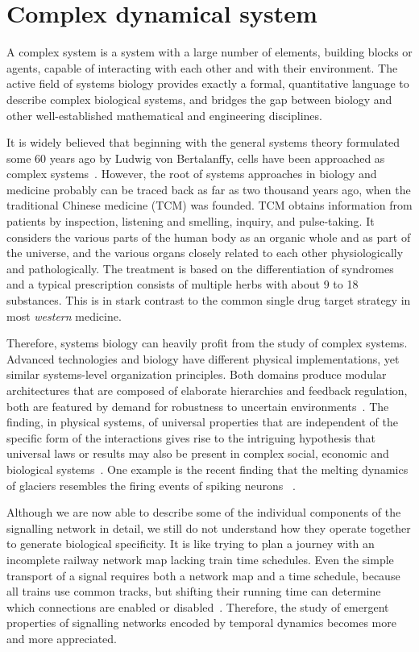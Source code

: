 \section{Complex dynamical system}
A complex system is a system with a large number of
elements, building blocks or agents, capable of interacting
with each other and with their environment.
The
active field of systems biology provides exactly a formal,
quantitative language to describe complex biological 
systems, and
bridges the gap between biology and other well-established
mathematical and engineering disciplines. 

It is widely believed that beginning with the general 
systems theory formulated some 
60 years ago by Ludwig von Bertalanffy, cells have been
approached as complex systems~\citep{Lazebnik2002a}. 
However, the root of systems approaches in biology and
medicine probably can be traced back as far as two 
thousand years
ago, when the traditional Chinese medicine (TCM) was 
founded. TCM obtains information from patients by 
inspection, 
listening and smelling, inquiry, and pulse-taking. 
It considers the various parts of the 
human body as an organic whole and as part of the 
universe, and the various organs closely 
related to each other physiologically and pathologically. 
The treatment is based on the 
differentiation of syndromes and a typical prescription
consists of multiple herbs with about 9 to 18 substances.
This is in stark contrast to the common single drug
target strategy in most \emph{western} medicine.

Therefore, systems biology can heavily profit from the
study of complex systems.
Advanced technologies and biology have different physical
implementations, yet similar systems-level organization
principles. Both domains produce modular architectures that are composed of elaborate hierarchies and feedback regulation, both are featured by demand for
robustness to uncertain environments~\citep{Csete2002}.
The
finding, in physical systems, of universal properties that
are independent of the specific form of the interactions
gives rise to the intriguing hypothesis that universal laws
or results may also be present in complex social, economic
and biological systems~\citep{Amaral2004}. One example is 
the recent finding that the melting dynamics of glaciers
resembles the firing events of spiking neurons~%
\citep{Chapuis2012}.

Although we are now able to describe some of the individual 
components of the 
signalling network in detail, we still do not understand how they operate together to generate biological specificity. It is like trying to plan a journey with an incomplete railway network map lacking train time schedules. Even the simple transport of a signal requires both a network map and a time schedule,
because all trains use common tracks, but shifting their 
running time can determine which connections are enabled or disabled~\citep{Kholodenko2010}.
Therefore, the study of emergent properties of signalling networks encoded by temporal dynamics becomes more and more
appreciated.

